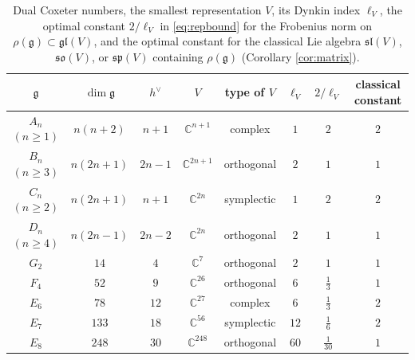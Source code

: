 \documentclass[leqno,10pt]{amsart}
\theoremstyle{definition}
\numberwithin{equation}{section}
\newcommand{\so}{\mathfrak{so}}
\renewcommand{\sp}{\mathfrak{sp}}
\newcommand{\gl}{\mathfrak{gl}}
\newcommand{\sll}{\mathfrak{sl}}
\newcommand{\g}{\mathfrak{g}}
\newcommand{\com}{\mathbb C}
\newcommand{\hv}{h^\vee}
\begin{document}
\begin{table}[h]
\centering
\renewcommand{\arraystretch}{1.3}
\begin{tabular}{cccccccc}
\hline
$\g$ & $\dim\g$ & $\hv$ & $V$ & type of $V$ & $\ell_{V}$ & $2/\ell_{V}$ & classical constant\\
\hline
$A_n$ $(n\geq 1)$ & $n(n+2)$ & $n+1$ & $\com^{n+1}$ & complex & $1$ & $2$ & $2$ \\
$B_n$ $(n\geq 3)$ & $n(2n+1)$ & $2n-1$ & $\com^{2n+1}$ & orthogonal & $2$ & $1$ & $1$ \\
$C_n$ $(n\geq 2)$ & $n(2n+1)$ & $n+1$ & $\com^{2n}$ & symplectic & $1$ & $2$ & $2$ \\
$D_n$ $(n\geq 4)$ & $n(2n-1)$ & $2n-2$ & $\com^{2n}$ & orthogonal & $2$ & $1$ & $1$ \\
$G_2$ & $14$ & $4$ & $\com^{7}$ & orthogonal & $2$ & $1$ & $1$ \\
$F_4$ & $52$ & $9$ & $\com^{26}$ & orthogonal & $6$ & $\tfrac{1}{3}$ & $1$ \\
$E_6$ & $78$ & $12$ & $\com^{27}$ & complex & $6$ & $\tfrac{1}{3}$ & $2$ \\
$E_7$ & $133$ & $18$ & $\com^{56}$ & symplectic & $12$ & $\tfrac{1}{6}$ & $2$ \\
$E_8$ & $248$ & $30$ & $\com^{248}$ & orthogonal & $60$ & $\tfrac{1}{30}$ & $1$ \\
\hline
\end{tabular}
\caption{Dual Coxeter numbers, the smallest representation $V$, its Dynkin index $\ell_{V}$, the optimal constant $2/\ell_{V}$ in \eqref{eq:repbound} for the Frobenius norm on $\rho(\g) \subset \gl(V)$, and the optimal constant for the classical Lie algebra $\sll(V)$, $\so(V)$, or $\sp(V)$ containing $\rho(\g)$ (Corollary \ref{cor:matrix}).}
\label{tab:improvement}
\end{table}
\end{document}
